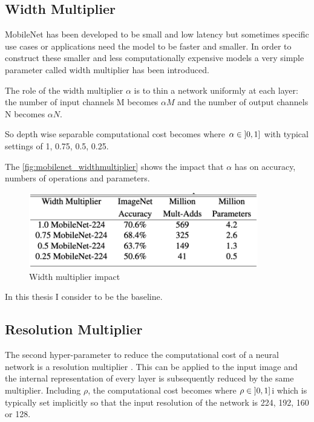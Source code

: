 \subsection{Width Multiplier}
MobileNet has been developed to be small and low latency but sometimes specific
use cases or applications need the model to be faster and smaller.
In order to construct these smaller and less computationally expensive models
a very simple parameter \bm{$\alpha$} called width multiplier has been
introduced.

The role of the width multiplier $\alpha$ is to thin a network uniformly at
each layer: the number of input channels M becomes $\alpha M$ and the number of
output channels N becomes $\alpha N$.

So depth wise separable computational cost becomes  where $\alpha \in \interval[open left]{0}{1}$ with typical settings of 1,
0.75, 0.5, 0.25.

The \autoref{fig:mobilenet_widthmultiplier} shows the impact that $\alpha$ has
on accuracy, numbers of operations and parameters.

\begin{figure}[ht]
    \includegraphics[width=10cm]{images/results/mobilenet_widthmultiplier.png}
    \centering
    \caption{Width multiplier impact}\label{fig:mobilenet_widthmultiplier}
\end{figure}

In this thesis I consider  to be the baseline.

\subsection{Resolution Multiplier}
The second hyper-parameter to reduce the computational cost of a neural network
is a resolution multiplier \bm{$\rho$}. This can be applied to the input image
and the internal representation of every layer is subsequently reduced by the
same multiplier.
Including $\rho$, the computational cost becomes  where $\rho \in \interval[open left]{0}{1}$i which is
typically set implicitly so that the input resolution of the network is 224,
192, 160 or 128.

